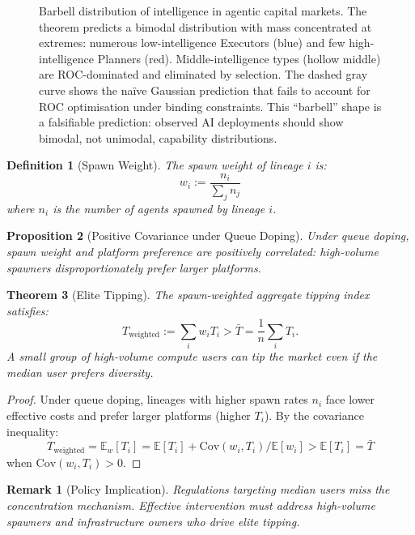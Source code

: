 \documentclass[12pt]{article}
\newtheorem{theorem}{Theorem}[section]
\newtheorem{proposition}[theorem]{Proposition}
\newtheorem{definition}[theorem]{Definition}
\newtheorem{remark}{Remark}[section]
\newcommand{\E}{\mathbb{E}}
\newcommand{\Cov}{\mathrm{Cov}}
\begin{document}
\begin{figure}[h]
\caption{Barbell distribution of intelligence in agentic capital markets. The theorem predicts a bimodal distribution with mass concentrated at extremes: numerous low-intelligence Executors (blue) and few high-intelligence Planners (red). Middle-intelligence types (hollow middle) are ROC-dominated and eliminated by selection. The dashed gray curve shows the na\"ive Gaussian prediction that fails to account for ROC optimisation under binding constraints. This ``barbell'' shape is a falsifiable prediction: observed AI deployments should show bimodal, not unimodal, capability distributions.}
\label{fig:barbell-distribution}
\end{figure}

\begin{definition}[Spawn Weight]
The \emph{spawn weight} of lineage $i$ is:
\[
w_i := \frac{n_i}{\sum_j n_j}
\]
where $n_i$ is the number of agents spawned by lineage $i$.
\end{definition}

\begin{proposition}[Positive Covariance under Queue Doping]
\label{prop:positive-covariance}
Under queue doping, spawn weight and platform preference are positively correlated: high-volume spawners disproportionately prefer larger platforms.
\end{proposition}

\begin{theorem}[Elite Tipping]
\label{thm:elite-tipping}
The spawn-weighted aggregate tipping index satisfies:
\[
T_{\mathrm{weighted}} := \sum_i w_i T_i > \bar{T} = \frac{1}{n} \sum_i T_i.
\]
A small group of high-volume compute users can tip the market even if the median user prefers diversity.
\end{theorem}

\begin{proof}
Under queue doping, lineages with higher spawn rates $n_i$ face lower effective costs and prefer larger platforms (higher $T_i$). By the covariance inequality:
\[
T_{\mathrm{weighted}} = \E_w[T_i] = \E[T_i] + \Cov(w_i, T_i) / \E[w_i] > \E[T_i] = \bar{T}
\]
when $\Cov(w_i, T_i) > 0$.
\end{proof}

\begin{remark}[Policy Implication]
Regulations targeting median users miss the concentration mechanism. Effective intervention must address high-volume spawners and infrastructure owners who drive elite tipping.
\end{remark}
\end{document}
